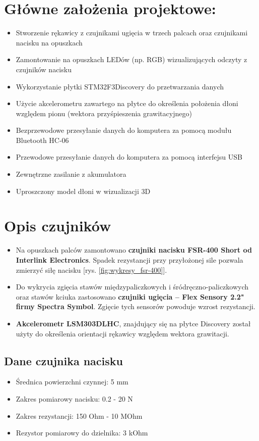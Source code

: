 \documentclass[12pt,a4paper]{article}
\begin{document}
\maketitle
\tableofcontents
\newpage


\section{Główne założenia projektowe: }\normalsize
\begin{itemize}
\item Stworzenie rękawicy z czujnikami ugięcia w trzech palcach oraz czujnikami nacisku na opuszkach
\item Zamontowanie na opuszkach LEDów (np. RGB) wizualizujących odczyty z czujników nacisku
\item Wykorzystanie płytki STM32F3Discovery do przetwarzania danych
\item Użycie akcelerometru zawartego na płytce do określenia położenia dłoni względem pionu (wektora przyśpieszenia grawitacyjnego)
\item Bezprzewodowe przesyłanie danych do komputera za pomocą modułu Bluetooth HC-06
\item Przewodowe przesyłanie danych do komputera za pomocą interfejsu USB
\item Zewnętrzne zasilanie z akumulatora
\item Uproszczony model dłoni w wizualizacji 3D
\end{itemize}

\section{Opis czujników}
\begin{itemize}
\item Na opuszkach palców zamontowano \textbf{czujniki nacisku FSR-400 Short od Interlink Electronics}. Spadek rezystancji przy przyłożonej sile pozwala zmierzyć siłę nacisku [rys. \ref{fig:wykresy_fsr-400}].
\item Do wykrycia zgięcia stawów międzypaliczkowych i śródręczno-paliczkowych oraz stawów kciuka zastosowano \textbf{czujniki ugięcia -- Flex Sensory 2.2" firmy Spectra Symbol}. Zgięcie tych sensorów powoduje wzrost rezystancji.
\item \textbf{Akcelerometr LSM303DLHC}, znajdujący się na płytce Discovery został użyty do określenia orientacji rękawicy względem wektora grawitacji.
\end{itemize}
\subsection{Dane czujnika nacisku}
\begin{itemize}
\item Średnica powierzchni czynnej: 5 mm
\item Zakres pomiarowy nacisku: 0.2 - 20 N
\item Zakres rezystancji: 150 Ohm - 10 MOhm
\item Rezystor pomiarowy do dzielnika: 3 kOhm
\end{itemize}
\end{document}
